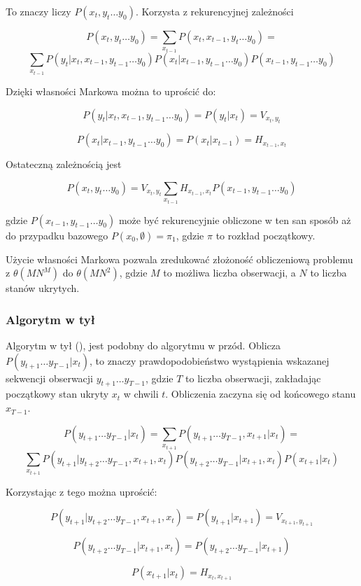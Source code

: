 To znaczy liczy $P(x_t, y_t \dots y_0)$. Korzysta z rekurencyjnej zależności

$$P(x_t, y_t \dots y_0) = \sum_{x_{t-1}} P(x_t, x_{t-1}, y_t \dots y_0) =$$
$$\sum_{x_{t-1}} P(y_t | x_t, x_{t-1}, y_{t-1} \dots y_0) P(x_t | x_{t-1}, y_{t-1} \dots y_0) P(x_{t-1}, y_{t-1} \dots y_0)$$

Dzięki własności Markowa można to uprościć do:

$$P(y_t | x_t, x_{t-1}, y_{t-1} \dots y_0) = P(y_t | x_t) = V_{x_t, y_t}$$

$$P(x_t | x_{t-1}, y_{t-1} \dots y_0) = P(x_t | x_{t-1}) = H_{x_{t-1}, x_t}$$

Ostateczną zależnością jest

$$P(x_t, y_t \dots y_0) = V_{x_t, y_t} \sum_{x_{t-1}} H_{x_{t-1}, x_t} P(x_{t-1}, y_{t-1} \dots y_0) $$

gdzie $P(x_{t-1}, y_{t-1} \dots y_0)$ może być rekurencyjnie obliczone w ten san sposób aż do przypadku bazowego $P(x_0, \emptyset) = \pi_1$, gdzie $\pi$ to rozkład początkowy.

Użycie własności Markowa pozwala zredukować złożoność obliczeniową problemu z $\theta(MN^M)$ do $\theta(MN^2)$, gdzie $M$ to możliwa liczba obserwacji, a $N$ to liczba stanów ukrytych.

\subsubsection{Algorytm w tył}

Algorytm w tył (), jest podobny do algorytmu w przód. Oblicza $P(y_{t+1} \dots y_{T-1} | x_t)$, to znaczy prawdopodobieństwo wystąpienia wskazanej sekwencji obserwacji $y_{t+1} \dots y_{T-1}$, gdzie $T$ to liczba obserwacji, zakładając początkowy stan ukryty $x_t$ w chwili $t$. Obliczenia zaczyna się od końcowego stanu $x_{T-1}$.

$$P(y_{t+1} \dots y_{T-1} | x_t) = \sum_{x_{t+1}} P(y_{t+1} \dots y_{T-1}, x_{t+1} | x_t) =$$
$$\sum_{x_{t+1}} P(y_{t+1} | y_{t+2} \dots y_{T-1}, x_{t+1}, x_t) P(y_{t+2} \dots y_{T-1} | x_{t+1}, x_t) P(x_{t+1} | x_t)$$

Korzystając z tego można uprościć:

$$P(y_{t+1} | y_{t+2} \dots y_{T-1}, x_{t+1}, x_t) = P(y_{t+1} | x_{t+1}) = V_{x_{t+1},y_{t+1}}$$

$$P(y_{t+2} \dots y_{T-1} | x_{t+1}, x_t) = P(y_{t+2} \dots y_{T-1} | x_{t+1})$$

$$P(x_{t+1} | x_t) = H_{x_t,x_{t+1}}$$

